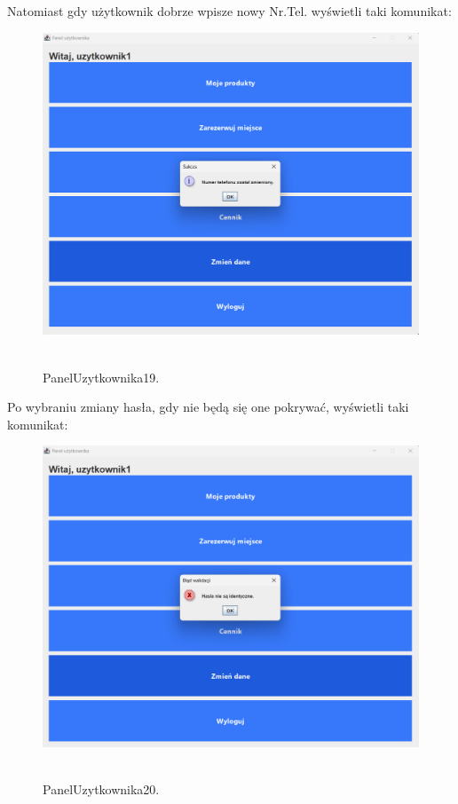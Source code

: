 Natomiast gdy użytkownik dobrze wpisze nowy Nr.Tel. wyświetli taki komunikat:

\begin{figure}[H]
    \centering
    \includegraphics[width=.9\linewidth]{figures/PanelUzytkownika19.png}\
    \caption{PanelUzytkownika19.\label{PanelUzytkownika19}}
\end{figure}

Po wybraniu zmiany hasła, gdy nie będą się one pokrywać, wyświetli taki komunikat:

\begin{figure}[H]
    \centering
    \includegraphics[width=.9\linewidth]{figures/PanelUzytkownika20.png}\
    \caption{PanelUzytkownika20.\label{PanelUzytkownika20}}
\end{figure}


